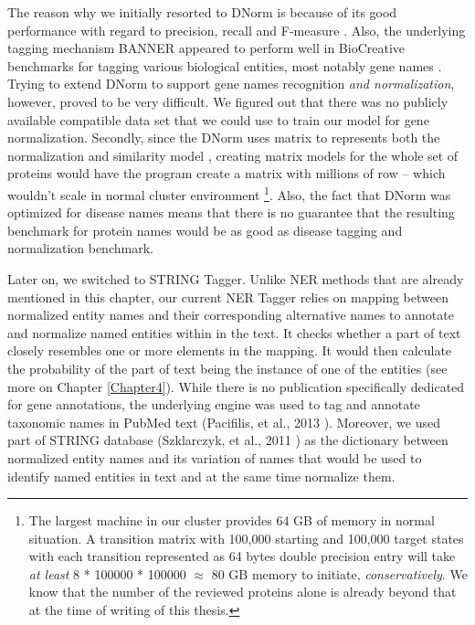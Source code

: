The reason why we initially resorted to DNorm is because of its good performance with regard to precision, recall and F-measure \citep{leaman2013dnorm}. Also, the underlying tagging mechanism BANNER appeared to perform well in BioCreative benchmarks for tagging various biological entities, most notably gene names \citep{smith2008overview} \citep{leaman2008banner}. Trying to extend DNorm to support gene names recognition \textit{and normalization}, however, proved to be very difficult. We figured out that there was no publicly available compatible data set that we could use to train our model for gene normalization. Secondly, since the DNorm uses matrix to represents both the normalization and similarity model \citep{leaman2013dnorm}, creating matrix models for the whole set of proteins would have the program create a matrix with millions of row -- which wouldn't scale in normal cluster environment \footnote{The largest machine in our cluster provides 64 GB of memory in normal situation. A transition matrix with 100,000 starting and 100,000 target states with each transition represented as 64 bytes double precision entry will take \textit{at least} 8 * 100000 * 100000 $\approx$ 80 GB memory to initiate, \textit{conservatively}. We know that the number of the reviewed proteins alone is already beyond that at the time of writing of this thesis.}. Also, the fact that DNorm was optimized for disease names means that there is no guarantee that the resulting benchmark for protein names would be as good as disease tagging and normalization benchmark.

Later on, we switched to STRING Tagger. Unlike NER methods that are already mentioned in this chapter, our current NER Tagger relies on mapping between normalized entity names and their corresponding alternative names to annotate and normalize named entities within in the text. It checks whether a part of text closely resembles one or more elements in the mapping. It would then calculate the probability of the part of text being the instance of one of the entities (see more on Chapter \ref{Chapter4}). While there is no publication specifically dedicated for gene annotations, the underlying engine was used to tag and annotate taxonomic names in PubMed text (Pacifilis, et al., 2013 \citep{pafilis2013species}). Moreover, we used part of STRING database (Szklarczyk, et al., 2011 \citep{szklarczyk2011string}) as the dictionary between normalized entity names and its variation of names that would be used to identify named entities in text and at the same time normalize them.


